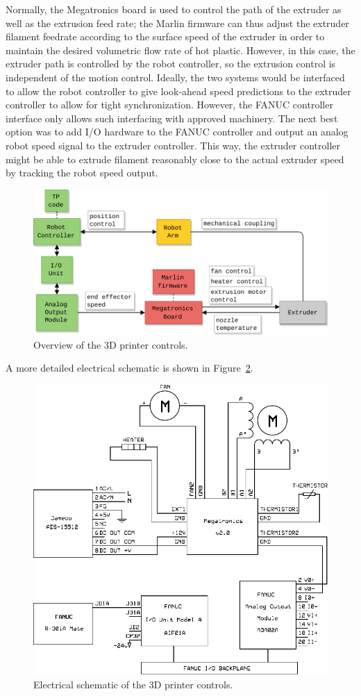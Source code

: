 Normally, the Megatronics board is used to control the path of the extruder as well as the extrusion feed rate; the Marlin firmware can thus adjust the extruder filament feedrate according to the surface speed of the extruder in order to maintain the desired volumetric flow rate of hot plastic. However, in this case, the extruder path is controlled by the robot controller, so the extrusion control is independent of the motion control. Ideally, the two systems would be interfaced to allow the robot controller to give look-ahead speed predictions to the extruder controller to allow for tight synchronization. However, the FANUC controller interface only allows such interfacing with approved machinery. The next best option was to add I/O hardware to the FANUC controller and output an analog robot speed signal to the extruder controller. This way, the extruder controller might be able to extrude filament reasonably close to the actual extruder speed by tracking the robot speed output.

\begin{figure}
    \centering
    \includegraphics[width=.8\linewidth]{figures/diagrams/system overview}
    \caption{Overview of the 3D printer controls.}
    \label{fig:sys-overview}
\end{figure}

A more detailed electrical schematic is shown in Figure~\ref{fig:schem-fig}. 

\begin{figure}
    \centering
    \includegraphics[width=.8\linewidth]{figures/diagrams/schematic-figure}
    \caption{Electrical schematic of the 3D printer controls.}
    \label{fig:schem-fig}
\end{figure}


